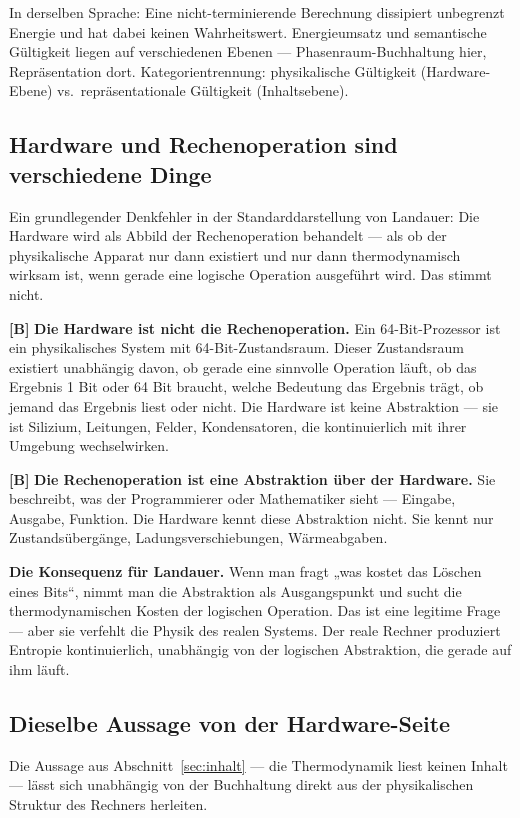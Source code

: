 In derselben Sprache: Eine nicht-terminierende Berechnung dissipiert unbegrenzt
Energie und hat dabei keinen Wahrheitswert. Energieumsatz und semantische
Gültigkeit liegen auf verschiedenen Ebenen --- Phasenraum-Buchhaltung hier,
Repräsentation dort. Kategorientrennung: physikalische Gültigkeit
(Hardware-Ebene) vs.\ repräsentationale Gültigkeit (Inhaltsebene).

\subsection{Hardware und Rechenoperation sind verschiedene Dinge}

Ein grundlegender Denkfehler in der Standarddarstellung von Landauer: Die Hardware
wird als Abbild der Rechenoperation behandelt --- als ob der physikalische Apparat
nur dann existiert und nur dann thermodynamisch wirksam ist, wenn gerade eine
logische Operation ausgeführt wird. Das stimmt nicht.

\textbf{[B]} \textbf{Die Hardware ist nicht die Rechenoperation.} Ein 64-Bit-Prozessor ist
ein physikalisches System mit 64-Bit-Zustandsraum. Dieser Zustandsraum existiert
unabhängig davon, ob gerade eine sinnvolle Operation läuft, ob das Ergebnis 1 Bit
oder 64 Bit braucht, welche Bedeutung das Ergebnis trägt, ob jemand das Ergebnis
liest oder nicht. Die Hardware ist keine Abstraktion --- sie ist Silizium,
Leitungen, Felder, Kondensatoren, die kontinuierlich mit ihrer Umgebung
wechselwirken.

\textbf{[B]} \textbf{Die Rechenoperation ist eine Abstraktion über der Hardware.} Sie
beschreibt, was der Programmierer oder Mathematiker sieht --- Eingabe, Ausgabe,
Funktion. Die Hardware kennt diese Abstraktion nicht. Sie kennt nur
Zustandsübergänge, Ladungsverschiebungen, Wärmeabgaben.

\textbf{Die Konsequenz für Landauer.} Wenn man fragt „was kostet das Löschen eines
Bits“, nimmt man die Abstraktion als Ausgangspunkt und sucht die thermodynamischen
Kosten der logischen Operation. Das ist eine legitime Frage --- aber sie verfehlt
die Physik des realen Systems. Der reale Rechner produziert Entropie
kontinuierlich, unabhängig von der logischen Abstraktion, die gerade auf ihm
läuft.

\subsection{Dieselbe Aussage von der Hardware-Seite}

Die Aussage aus Abschnitt~\ref{sec:inhalt} --- die Thermodynamik liest keinen
Inhalt --- lässt sich unabhängig von der Buchhaltung direkt aus der physikalischen
Struktur des Rechners herleiten.

